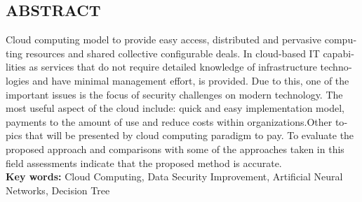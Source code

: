 \documentclass[a4paper,oneside,12pt]{report}
\begin{document}
\newpage
\begin{latin}
\section*{ABSTRACT}
\thispagestyle{empty}
Cloud computing model to provide easy access, distributed and pervasive computing resources and shared collective configurable deals. In cloud-based IT capabilities as services that do not require detailed knowledge of infrastructure technologies and have minimal management effort, is provided. Due to this, one of the important issues is the focus of security challenges on modern technology. The most useful aspect of the cloud include: quick and easy implementation model, payments to the amount of use and reduce costs within organizations.Other topics that will be presented by cloud computing paradigm to pay. To evaluate the proposed approach and comparisons with some of the approaches taken in this field assessments indicate that the proposed method is accurate.\\[0.5cm]
\textbf{Key words:}
Cloud Computing, Data Security Improvement, Artificial Neural Networks, Decision Tree
\end{latin}
\end{document}
